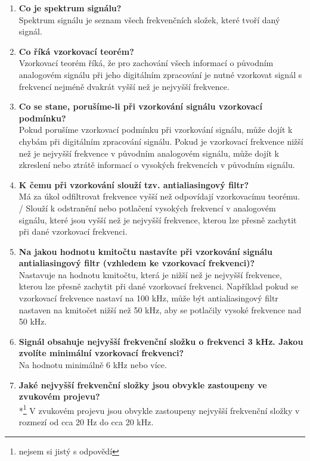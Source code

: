 \documentclass{article}
\begin{document}
\begin{enumerate}
        \item \textbf{Co je spektrum signálu?} \\[0.6em] { Spektrum signálu je seznam všech frekvenčních složek, které tvoří daný signál.}
        \item \textbf{Co říká vzorkovací teorém?} \\[0.6em] { Vzorkovací teorém říká, že pro zachování všech informací o původním analogovém signálu při jeho digitálním zpracování je nutné vzorkovat signál s frekvencí nejméně dvakrát vyšší než je nejvyšší frekvence.}
        \item \textbf{Co se stane, porušíme-li při vzorkování signálu vzorkovací podmínku?} \\[0.6em] { Pokud porušíme vzorkovací podmínku při vzorkování signálu, může dojít k chybám při digitálním zpracování signálu. Pokud je vzorkovací frekvence nižší než je nejvyšší frekvence v původním analogovém signálu, může dojít k zkreslení nebo ztrátě informací o vysokých frekvencích v původním signálu.}
        \item \textbf{K čemu při vzorkování slouží tzv. antialiasingový filtr?} \\[0.6em] { Má za úkol odfiltrovat frekvence vyšší než odpovídají vzorkovacímu teorému. / Slouží k odstranění nebo potlačení vysokých frekvencí v analogovém signálu, které jsou vyšší než je nejvyšší frekvence, kterou lze přesně zachytit při dané vzorkovací frekvenci.}
        \item \textbf{Na jakou hodnotu kmitočtu nastavíte při vzorkování signálu antialiasingový filtr (vzhledem ke vzorkovací frekvenci)?} \\[0.6em] { Nastavuje na hodnotu kmitočtu, která je nižší než je nejvyšší frekvence, kterou lze přesně zachytit při dané vzorkovací frekvenci. Například pokud se vzorkovací frekvence nastaví na 100 kHz, může být antialiasingový filtr nastaven na kmitočet nižší než 50 kHz, aby se potlačily vysoké frekvence nad 50 kHz.}
        \item \textbf{Signál obsahuje nejvyšší frekvenční složku o frekvenci 3 kHz. Jakou zvolíte minimální vzorkovací frekvenci?} \\[0.6em] { Na hodnotu minimálně 6 kHz nebo více.}
        \item \textbf{Jaké nejvyšší frekvenční složky jsou obvykle zastoupeny ve zvukovém projevu? } \\[0.6em] {*\footnote[4]{nejsem si jistý s odpovědí} V zvukovém projevu jsou obvykle zastoupeny nejvyšší frekvenční složky v rozmezí od cca 20 Hz do cca 20 kHz.}

\end{enumerate}
\end{document}

